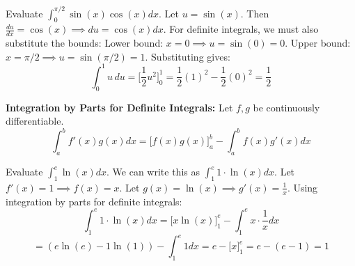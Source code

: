\begin{example}
    Evaluate $\int_0^{\pi/2} \sin(x) \cos(x) dx$.
    Let $u = \sin(x)$. Then $\frac{du}{dx} = \cos(x) \implies du = \cos(x) dx$.
    For definite integrals, we must also substitute the bounds:
    Lower bound: $x = 0 \implies u = \sin(0) = 0$.
    Upper bound: $x = \pi/2 \implies u = \sin(\pi/2) = 1$.
    Substituting gives:
    $$\int_0^1 u \, du = \Big[ \frac{1}{2} u^2 \Big]_0^1 = \frac{1}{2} (1)^2 - \frac{1}{2} (0)^2 = \frac{1}{2}$$
\end{example}

\begin{lemma}
    \textbf{Integration by Parts for Definite Integrals:} Let $f, g$ be continuously differentiable.
    $$\int_{a}^{b} f'(x)g(x)dx  = \Big[ f(x)g(x) \Big]_{a}^{b} - \int_{a}^{b} f(x)g'(x)dx$$
\end{lemma}

\begin{example}
    Evaluate $\int_1^e \ln(x) dx$.
    We can write this as $\int_1^e 1 \cdot \ln(x) dx$.
    Let $f'(x) = 1 \implies f(x) = x$.
    Let $g(x) = \ln(x) \implies g'(x) = \frac{1}{x}$.
    Using integration by parts for definite integrals:
    $$\int_1^e 1 \cdot \ln(x) dx = \Big[ x \ln(x) \Big]_1^e - \int_1^e x \cdot \frac{1}{x} dx$$
    $$= (e \ln(e) - 1 \ln(1)) - \int_1^e 1 dx = e - \Big[ x \Big]_1^e = e - (e - 1) = 1$$
\end{example}

